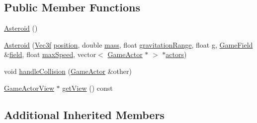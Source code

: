 \subsection*{Public Member Functions}
\begin{DoxyCompactItemize}
\item 
\hyperlink{class_asteroid_a603c2eb87a4ed26c5b3fb06e953d611c}{Asteroid} ()
\item 
\hyperlink{class_asteroid_a867c9432a4cff5133290762ef6948042}{Asteroid} (\hyperlink{class_vec3f}{Vec3f} \hyperlink{class_game_actor_aefed3c91bf32ad388d86657b3bb9ddfa}{position}, double \hyperlink{class_game_actor_a2111233f4f0216db4d172d5088ebeed4}{mass}, float \hyperlink{class_game_actor_a9c0ba51b08a3e617d9629c0ee8d309f2}{gravitation\+Range}, float \hyperlink{class_game_actor_a42ed4bef0d99cf053ff9a025c86d34d3}{g}, \hyperlink{class_game_field}{Game\+Field} \&\hyperlink{class_game_actor_a0224fbc502abd6b7579787aa234332d5}{field}, float \hyperlink{class_game_actor_a15b6abd006c52b21c569932f8b484eb0}{max\+Speed}, vector$<$ \hyperlink{class_game_actor}{Game\+Actor} $\ast$ $>$ $\ast$\hyperlink{class_game_actor_a2405618d895f5143b42ae9e94d20e693}{actors})
\item 
void \hyperlink{class_asteroid_ada68cafcbb9e41c90f3e372de1a4b0ba}{handle\+Collision} (\hyperlink{class_game_actor}{Game\+Actor} \&other)
\item 
\hyperlink{class_game_actor_view}{Game\+Actor\+View} $\ast$ \hyperlink{class_asteroid_a267c313e8759ca6091455616cc6c40f1}{get\+View} () const 
\end{DoxyCompactItemize}
\subsection*{Additional Inherited Members}


